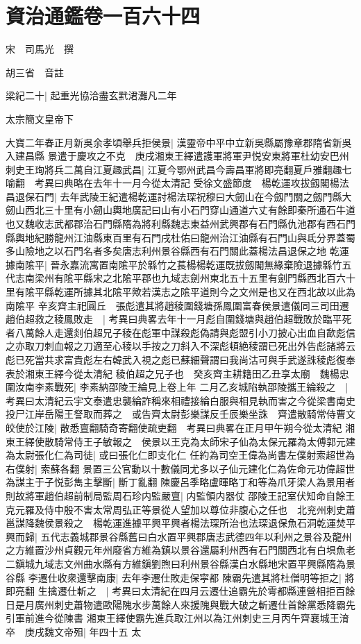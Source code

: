 \chapter{資治通鑑卷一百六十四}
宋　司馬光　撰

胡三省　音註

梁紀二十|{
	起重光協洽盡玄黓涒灘凡二年}


太宗簡文皇帝下

大寶二年春正月新吳余孝頃舉兵拒侯景|{
	漢靈帝中平中立新吳縣屬豫章郡隋省新吳入建昌縣}
景遣于慶攻之不克　庚戌湘東王繹遣護軍將軍尹悦安東將軍杜幼安巴州刺史王珣將兵二萬自江夏趣武昌|{
	江夏今鄂州武昌今壽昌軍將即亮翻夏戶雅翻趣七喻翻　考異曰典略在去年十一月今從太清記}
受徐文盛節度　楊乾運攻拔劔閣楊法昌退保石門|{
	去年武陵王紀遣楊乾運討楊法琛祝穆曰大劒山在今劔門關之劔門縣大劒山西北三十里有小劒山輿地廣記曰山有小石門穿山通道六丈有餘即秦所通石牛道也又魏收志武都郡治石門縣隋為將利縣魏志東益州武興郡有石門縣仇池郡有西石門縣輿地紀勝龍州江油縣東百里有石門戌杜佑曰龍州治江油縣有石門山與氐分界蓋蜀多山險地之以石門名者多矣唐志利州景谷縣西有石門關此蓋楊法昌退保之地}
乾運據南隂平|{
	晉永嘉流寓置南隂平於緜竹之萇楊楊乾運既拔劔閣無緣棄險退據緜竹五代志南梁州有隂平縣宋之北隂平郡也九域志劍州東北五十五里有劍門縣西北百六十里有隂平縣乾運所據其北隂平歟若漢志之隂平道則今之文州是也又在西北故以此為南隂平}
辛亥齊主祀圓丘　張彪遣其將趙稜圍錢塘孫鳳圍富春侯景遣儀同三司田遷趙伯超救之稜鳳敗走　|{
	考異曰典畧去年十一月彪自圍錢塘與趙伯超戰敗於臨平死者八萬餘人走還剡伯超兄子稜在彪軍中謀殺彪偽請與彪盟引小刀披心出血自歃彪信之亦取刀刺血報之刀適至心稜以手按之刀斜入不深彪頓絶稜謂已死出外告彪諸將云彪已死當共求富貴彪左右韓武入視之彪已蘇細聲謂曰我尚沽可與手武遂誅稜彪復奉表於湘東王繹今從太清紀}
稜伯超之兄子也　癸亥齊主耕籍田乙丑享太廟　魏楊忠圍汝南李素戰死|{
	李素納邵陵王綸見上卷上年}
二月乙亥城陷執邵陵攜王綸殺之　|{
	考異曰太清紀云宇文泰遣忠襲綸詐稱來相禮接綸白服與相見執而害之今從梁書南史}
投尸江岸岳陽王詧取而葬之　或告齊太尉彭樂謀反壬辰樂坐誅　齊遣散騎常侍曹文皎使於江陵|{
	散悉亶翻騎奇寄翻使疏吏翻　考異曰典畧在正月甲午朔今從太清紀}
湘東王繹使散騎常侍王子敏報之　侯景以王克為太師宋子仙為太保元羅為太傅郭元建為太尉張化仁為司徒|{
	或曰張化仁即支化仁}
任約為司空王偉為尚書左僕射索超世為右僕射|{
	索蘇各翻}
景置三公官動以十數儀同尤多以子仙元建化仁為佐命元功偉超世為謀主于子悦彭雋主擊斷|{
	斷丁亂翻}
陳慶呂季略盧暉略丁和等為爪牙梁人為景用者則故將軍趙伯超前制局監周石珍内監嚴亶|{
	内監領内器仗}
邵陵王記室伏知命自餘王克元羅及侍中殷不害太常周弘正等景從人望加以尊位非腹心之任也　北兖州刺史蕭邕謀降魏侯景殺之　楊乾運進據平興平興者楊法琛所治也法琛退保魚石洞乾運焚平興而歸|{
	五代志義城郡景谷縣舊曰白水置平興郡唐志武德四年以利州之景谷及龍州之方維置沙州貞觀元年州廢省方維為鎮以景谷還屬利州西有石門關西北有白埧魚老二鎭城九域志文州曲水縣有方維鎭劉煦曰利州景谷縣漢白水縣地宋置平興縣隋為景谷縣}
李遷仕收衆還擊南康|{
	去年李遷仕敗走保寜都}
陳霸先遣其將杜僧明等拒之|{
	將即亮翻}
生擒遷仕斬之　|{
	考異曰太清紀在四月云遷仕追霸先於雩都縣連營相拒百餘日是月廣州刺史蕭物遣歐陽隗水步萬餘人來援隗與戰大破之斬遷仕首餘黨悉降霸先引軍前進今從陳書}
湘東王繹使霸先進兵取江州以為江州刺史三月丙午齊襄城王淯卒　庚戌魏文帝殂|{
	年四十五}
太

